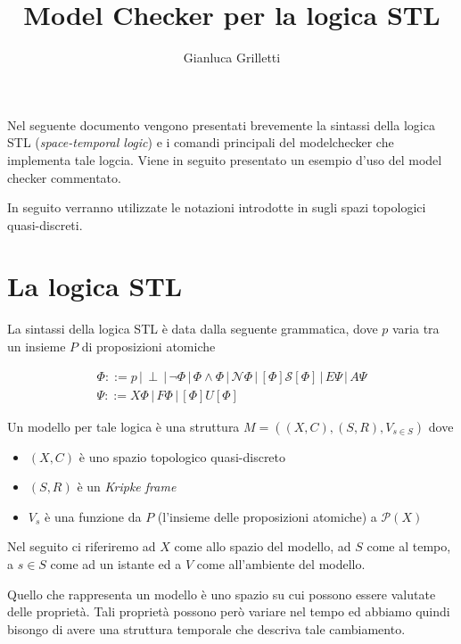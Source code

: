 \documentclass[a4paper,11pt]{article}
\title{Model Checker per la logica STL}
\author{Gianluca Grilletti}
\newcommand{\Near}{\mathcal{N}}
\newcommand{\Surr}{\mathcal{S}}
\renewcommand{\(}{\left(}
\renewcommand{\)}{\right)}
\newcommand{\<}{\textlangle}
\renewcommand{\>}{\textrangle}
\begin{document}
\maketitle

\pagebreak

Nel seguente documento vengono presentati brevemente la sintassi della logica STL (\emph{space-temporal logic}) e i comandi principali del modelchecker che implementa tale logcia. Viene in seguito presentato un esempio d'uso del model checker commentato.

In seguito verranno utilizzate le notazioni introdotte in \cite{ciancia} sugli spazi topologici quasi-discreti.


\section{La logica STL}

La sintassi della logica STL è data dalla seguente grammatica, dove $p$ varia tra un insieme $P$ di proposizioni atomiche

\begin{gather}
 \Phi ::= p \,|\, \perp \,|\, \neg \Phi \,|\, \Phi \wedge \Phi \,|\, \Near \Phi \,|\, [\Phi] \Surr [\Phi] \,|\, E \Psi \,|\, A \Psi \\
 \Psi ::= X \Phi \,|\, F \Phi \,|\, [\Phi ] U [\Phi ]
\end{gather}

Un modello per tale logica è una struttura $ M = ( ( X , C ) , ( S , R ) , V_{s\in S} ) $ dove
\begin{itemize}
 \item $(X,C)$ è uno spazio topologico quasi-discreto
 \item $(S,R)$ è un \emph{Kripke frame}
 \item $V_s$ è una funzione da $P$ (l'insieme delle proposizioni atomiche) a $\mathcal{P} (X)$
\end{itemize}

Nel seguito ci riferiremo ad $X$ come allo spazio del modello, ad $S$ come al tempo, a $s\in S$ come ad un istante ed a $V$ come all'ambiente del modello.

Quello che rappresenta un modello è uno spazio su cui possono essere valutate delle proprietà. Tali proprietà possono però variare nel tempo ed abbiamo quindi bisongo di avere una struttura temporale che descriva tale cambiamento.
\end{document}
